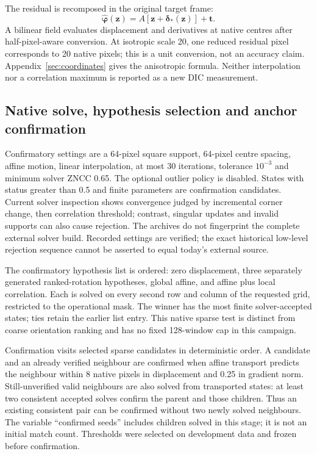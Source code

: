 The residual is recomposed in the original target frame:
\begin{equation}
\widehat{\boldsymbol\varphi}(\mathbf z)=A[\mathbf z+\boldsymbol\delta_*(\mathbf z)]+\mathbf t.
\label{eq:composition}
\end{equation}
A bilinear field evaluates displacement and derivatives at native centres after half-pixel-aware conversion. At isotropic scale 20, one reduced residual pixel corresponds to 20 native pixels; this is a unit conversion, not an accuracy claim. Appendix~\ref{sec:coordinates} gives the anisotropic formula. Neither interpolation nor a correlation maximum is reported as a new DIC measurement.

\subsection{Native solve, hypothesis selection and anchor confirmation}
Confirmatory settings are a 64-pixel square support, 64-pixel centre spacing, affine motion, linear interpolation, at most 30 iterations, tolerance $10^{-3}$ and minimum solver ZNCC 0.65. The optional outlier policy is disabled. States with status greater than 0.5 and finite parameters are confirmation candidates. Current solver inspection shows convergence judged by incremental corner change, then correlation threshold; contrast, singular updates and invalid supports can also cause rejection. The archives do not fingerprint the complete external solver build. Recorded settings are verified; the exact historical low-level rejection sequence cannot be asserted to equal today's external source.

The confirmatory hypothesis list is ordered: zero displacement, three separately generated ranked-rotation hypotheses, global affine, and affine plus local correlation. Each is solved on every second row and column of the requested grid, restricted to the operational mask. The winner has the most finite solver-accepted states; ties retain the earlier list entry. This native sparse test is distinct from coarse orientation ranking and has no fixed 128-window cap in this campaign.

Confirmation visits selected sparse candidates in deterministic order. A candidate and an already verified neighbour are confirmed when affine transport predicts the neighbour within 8 native pixels in displacement and 0.25 in gradient norm. Still-unverified valid neighbours are also solved from transported states: at least two consistent accepted solves confirm the parent and those children. Thus an existing consistent pair can be confirmed without two newly solved neighbours. The variable ``confirmed seeds'' includes children solved in this stage; it is not an initial match count. Thresholds were selected on development data and frozen before confirmation.

